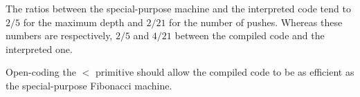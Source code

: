 \documentclass[a4paper,12pt]{article}
\begin{document}
The ratios between the special-purpose machine and the interpreted
code tend to $2/5$ for the maximum depth and $2/21$ for the number of
pushes.  Whereas these numbers are respectively, $2/5$ and $4/21$
between the compiled code and the interpreted one.

Open-coding the $<$ primitive should allow the compiled code to be as
efficient as the special-purpose Fibonacci machine.
\end{document}
